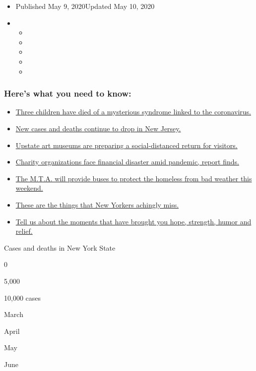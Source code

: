 \begin{itemize}
\item
  Published May 9, 2020Updated May 10, 2020
\item
  \begin{itemize}
  \item
  \item
  \item
  \item
  \item
  \end{itemize}
\end{itemize}

\hypertarget{heres-what-you-need-to-know}{%
\subsubsection{Here's what you need to
know:}\label{heres-what-you-need-to-know}}

\begin{itemize}
\tightlist
\item
  \protect\hyperlink{link-3f08228}{Three children have died of a
  mysterious syndrome linked to the coronavirus.}
\item
  \protect\hyperlink{link-6dde2e2b}{New cases and deaths continue to
  drop in New Jersey.}
\item
  \protect\hyperlink{link-1f0c70d2}{Upstate art museums are preparing a
  social-distanced return for visitors.}
\item
  \protect\hyperlink{link-da157b4}{Charity organizations face financial
  disaster amid pandemic, report finds.}
\item
  \protect\hyperlink{link-cf07561}{The M.T.A. will provide buses to
  protect the homeless from bad weather this weekend.}
\item
  \protect\hyperlink{link-7e6fe594}{These are the things that New
  Yorkers achingly miss.}
\item
  \protect\hyperlink{link-2783e401}{Tell us about the moments that have
  brought you hope, strength, humor and relief.}
\end{itemize}

Cases and deaths in New York State

0

5,000

10,000 cases

March

April

May

June

